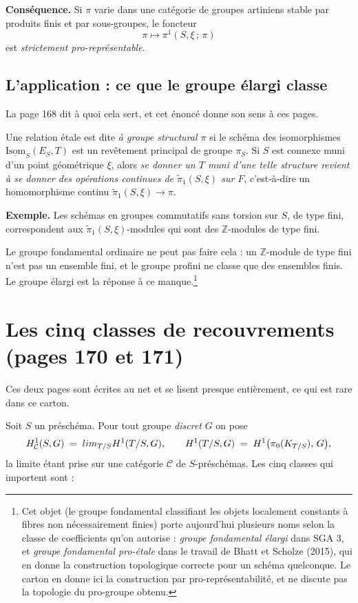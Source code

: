 \documentclass[11pt,a4paper]{article}
\begin{document}
\textbf{Conséquence.} Si $\pi$ varie dans une catégorie de groupes artiniens
stable par produits finis et par sous-groupes, le foncteur
\[
  \pi \longmapsto \pi^{1}(S, \xi\,;\, \pi)
\]
est \emph{strictement pro-représentable}.

\subsection*{L'application : ce que le groupe élargi classe}

La page 168 dit à quoi cela sert, et cet énoncé donne son sens à ces pages.

Une relation étale est dite \emph{à groupe structural $\pi$} si le schéma des
isomorphismes $\underline{\mathrm{Isom}}_{S}(E_{S}, T)$ est un revêtement
principal de groupe $\pi_{S}$. Si $S$ est connexe muni d'un point géométrique
$\xi$, alors \emph{se donner un $T$ muni d'une telle structure revient à se
donner des opérations continues de $\tilde{\pi}_{1}(S, \xi)$ sur $F$},
c'est-à-dire un homomorphisme continu $\tilde{\pi}_{1}(S,\xi) \to \pi$.

\textbf{Exemple.} Les schémas en groupes commutatifs sans torsion sur $S$, de
type fini, correspondent aux $\tilde{\pi}_{1}(S,\xi)$-modules qui sont des
$\mathbb{Z}$-modules de type fini.

Le groupe fondamental ordinaire ne peut pas faire cela : un
$\mathbb{Z}$-module de type fini n'est pas un ensemble fini, et le groupe
profini ne classe que des ensembles finis. Le groupe élargi est la réponse à ce
manque.\footnote{Cet objet (le groupe fondamental classifiant les objets
localement constants à fibres non nécessairement finies) porte aujourd'hui
plusieurs noms selon la classe de coefficients qu'on autorise : \emph{groupe
fondamental élargi} dans SGA 3, et \emph{groupe fondamental pro-étale} dans le
travail de Bhatt et Scholze (2015), qui en donne la construction topologique
correcte pour un schéma quelconque. Le carton en donne ici la construction par
pro-représentabilité, et ne discute pas la topologie du pro-groupe obtenu.}

\section*{Les cinq classes de recouvrements (pages 170 et 171)}

Ces deux pages sont écrites au net et se lisent presque entièrement, ce qui
est rare dans ce carton.

Soit $S$ un préschéma. Pour tout groupe \emph{discret} $G$ on pose
\[
  H^{1}_{\mathcal{C}}(S, G) \;=\; \varinjlim_{T/S} H^{1}(T/S, G) ,
  \qquad
  H^{1}(T/S, G) \;=\; H^{1}\bigl(\pi_{0}(K_{T/S}),\, G\bigr) ,
\]
la limite étant prise sur une catégorie $\mathcal{C}$ de $S$-préschémas. Les
cinq classes qui importent sont :
\end{document}
